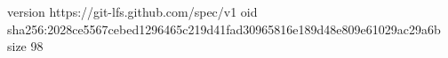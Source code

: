 version https://git-lfs.github.com/spec/v1
oid sha256:2028ce5567cebed1296465c219d41fad30965816e189d48e809e61029ac29a6b
size 98
